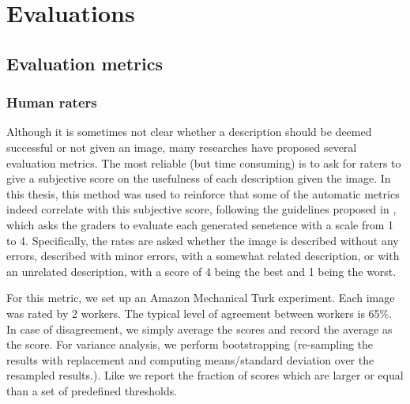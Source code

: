 \section{Evaluations}

\subsection{Evaluation metrics}
	\subsubsection{Human raters}
	Although it is sometimes not clear whether a description should be deemed successful or not given an image, many researches have proposed several evaluation metrics. The most reliable (but time consuming) is to ask for raters to give a subjective score on the usefulness of each description given the image. In this thesis, this method was used to reinforce that some of the automatic metrics indeed correlate with this subjective score, following the guidelines proposed in \cite{Hodosh:2013:FID:2566972.2566993}, which asks the graders to evaluate each generated senetence with a scale from 1 to 4. Specifically, the rates are asked whether the image is described without any errors, described with minor errors, with a somewhat related description, or with an unrelated description, with a score of 4 being the best and 1 being the worst.

	For this metric, we set up an Amazon Mechanical Turk experiment. Each image was rated by 2 workers. The typical level of agreement between workers is 65\%. In case of disagreement, we simply average the scores and record the average as the score. For variance analysis, we perform bootstrapping (re-sampling the results with replacement and computing means/standard deviation over the resampled results.). Like \cite{Hodosh:2013:FID:2566972.2566993} we report the fraction of scores which are larger or equal than a set of predefined thresholds.